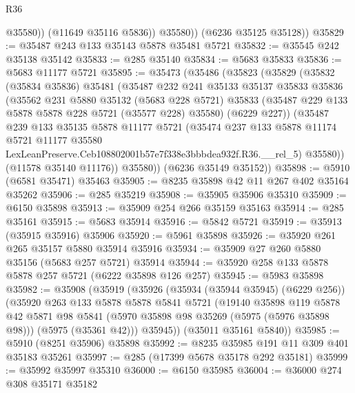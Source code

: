 \begin{lexlean}{R36}
\begin{coremodule}
                @35580))
            (@11649 @35116 @5836))
          @35580))
      (@6236 @35125 @35128))
@35829 := @35487 @243 @133 @35143 @5878 @35481 @5721
@35832 := @35545 @242 @35138 @35142
@35833 := @285 @35140
@35834 := @5683 @35833
@35836 := @5683 @11177 @5721
@35895 := @35473
    (@35486
      (@35823
        (@35829
          (@35832
            (@35834 @35836)
            @35481
            (@35487
              @232
              @241
              @35133
              @35137
              @35833
              @35836
              (@35562
                @231
                @5880
                @35132
                (@5683 @228 @5721)
                @35833
                (@35487 @229 @133 @5878 @5878 @228 @5721 (@35577 @228) @35580)
                (@6229 @227))
              (@35487
                @239
                @133
                @35135
                @5878
                @11177
                @5721
                (@35474
                  @237
                  @133
                  @5878
                  @11174
                  @5721
                  @11177
                  @35580
                  LexLeanPreserve.Ceb108802001b57e7f338e3bbbdea932f.R36.__rel_5)
                @35580))
            (@11578 @35140 @11176))
          @35580))
      (@6236 @35149 @35152))
@35898 := @5910 (@6581 @35471) @35463
@35905 := @8235 @35898 @42 @11 @267 @402 @35164 @35262
@35906 := @285 @35219
@35908 := @35905 @35906 @35310
@35909 := @6150 @35898
@35913 := @35909 @254 @266 @35159 @35163
@35914 := @285 @35161
@35915 := @5683 @35914
@35916 := @5842 @5721
@35919 := @35913 (@35915 @35916) @35906
@35920 := @5961 @35898
@35926 := @35920 @261 @265 @35157 @5880 @35914 @35916
@35934 := @35909 @27 @260 @5880 @35156 (@5683 @257 @5721) @35914
@35944 := @35920 @258 @133 @5878 @5878 @257 @5721 (@6222 @35898 @126 @257)
@35945 := @5983 @35898
@35982 := @35908
    (@35919
      (@35926
        (@35934 (@35944 @35945) (@6229 @256))
        (@35920
          @263
          @133
          @5878
          @5878
          @5841
          @5721
          (@19140
            @35898
            @119
            @5878
            @42
            @5871
            @98
            @5841
            (@5970 @35898 @98 @35269 (@5975 (@5976 @35898 @98)))
            (@5975 (@35361 @42)))
          @35945))
      (@35011 @35161 @5840))
@35985 := @5910 (@8251 @35906) @35898
@35992 := @8235 @35985 @191 @11 @309 @401 @35183 @35261
@35997 := @285 (@17399 @5678 @35178 @292 @35181)
@35999 := @35992 @35997 @35310
@36000 := @6150 @35985
@36004 := @36000 @274 @308 @35171 @35182

\end{coremodule}
\end{lexlean}
